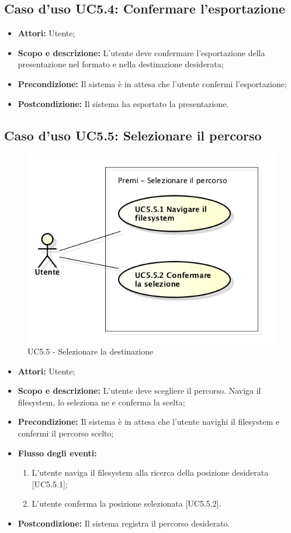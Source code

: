 \subsection{Caso d'uso UC5.4: Confermare l'esportazione}
	\begin{itemize}
		\item \textbf{Attori:} Utente;
		\item \textbf{Scopo e descrizione:} L'utente deve confermare l'esportazione della presentazione nel formato e nella destinazione desiderata;
		\item \textbf{Precondizione:} Il sistema è in attesa che l'utente confermi l'esportazione;
		\item \textbf{Postcondizione:} Il sistema ha esportato la presentazione.
	\end{itemize}
	
	
\subsection{Caso d'uso UC5.5: Selezionare il percorso}
	\begin{figure}[h] 
		\centering 
		\includegraphics[scale=0.45] {img/UC5.5.png} 
		\caption{UC5.5 - Selezionare la destinazione} 
	\end{figure}
	\begin{itemize}
		\item \textbf{Attori:} Utente;
		\item \textbf{Scopo e descrizione:} L'utente deve scegliere il percorso. Naviga il filesystem, lo seleziona ne e conferma la scelta;
		\item \textbf{Precondizione:} Il sistema è in attesa che l'utente navighi il filesystem e confermi il percorso scelto;
		\item \textbf{Flusso degli eventi:}
		\begin{enumerate}
			\item L'utente naviga il filesystem alla ricerca della posizione desiderata [UC5.5.1];
			\item L'utente conferma la posizione selezionata [UC5.5.2].
		\end{enumerate}
		\item \textbf{Postcondizione:} Il sistema registra il percorso desiderato.
	\end{itemize}
	
